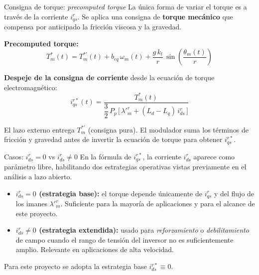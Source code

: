 \documentclass[aspectratio=169,t]{beamer}
\begin{document}
\begin{frame}{Consigna de torque: \emph{precomputed torque}}
{\small\color{uncGray}La única forma de variar el torque es a través de la corriente $i_{qs}^{r}$. Se aplica una consigna de \textbf{torque mecánico} que compensa por anticipado la fricción viscosa y la gravedad.}\par
\vspace{3mm}

\textbf{Precomputed torque:}
\begin{equation*}
T_m^{*}(t) = T_m^{*\prime}(t) + b_{eq}\,\omega_m(t) + \frac{g\,k_l}{r}\,\sin\!\left(\frac{\theta_m(t)}{r}\right)
\end{equation*}

\textbf{Despeje de la consigna de corriente} desde la ecuación de torque electromagnético:
\begin{equation*}
i_{qs}^{r*}(t) = \frac{T_m^{*}(t)}{\dfrac{3}{2}\,P_p\,\big[\,\lambda'^r_m + (L_d - L_q)\,i_{ds}^{r}\,\big]}
\end{equation*}

\vspace{2mm}
{\small El lazo externo entrega $T_m^{*\prime}$ (consigna pura). El modulador suma los términos de fricción y gravedad antes de invertir la ecuación de torque para obtener $i_{qs}^{r*}$.}
\end{frame}

\begin{frame}{Casos: $i_{ds}^{r}=0$ vs $i_{ds}^{r}\neq 0$}
{\small\color{uncGray}En la fórmula de $i_{qs}^{r*}$, la corriente $i_{ds}^{r}$ aparece como parámetro libre, habilitando dos estrategias operativas vistas previamente en el análisis a lazo abierto.}\par
\vspace{4mm}

\begin{itemize}
\item \textbf{$i_{ds}^{r} = 0$ (estrategia base):} el torque depende únicamente de $i_{qs}^{r}$ y del flujo de los imanes $\lambda'^r_m$. Suficiente para la mayoría de aplicaciones y para el alcance de este proyecto.

\item \textbf{$i_{ds}^{r} \neq 0$ (estrategia extendida):} usado para \emph{reforzamiento} o \emph{debilitamiento} de campo cuando el rango de tensión del inversor no es suficientemente amplio. Relevante en aplicaciones de alta velocidad.
\end{itemize}

\vspace{2mm}
{\small Para este proyecto se adopta la estrategia base $i_{ds}^{r*}\equiv 0$.}
\end{frame}
\end{document}
